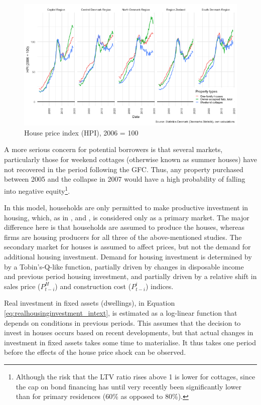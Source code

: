 \documentclass[
]{book}
\begin{document}
\begin{figure}[H]
\includegraphics[width=0.95\linewidth]{figures/fl-fi-house-prices-regional-1} \caption{House price index (HPI), 2006 = 100}\label{fig:fl-fi-house-prices-regional}
\end{figure}

A more serious concern for potential borrowers is that several markets, particularly those for weekend cottages (otherwise known as summer houses) have not recovered in the period following the GFC. Thus, any property purchased between 2005 and the collapse in 2007 would have a high probability of falling into negative equity\footnote{Although the risk that the LTV ratio rises above 1 is lower for cottages, since the cap on bond financing has until very recently been significantly lower than for primary residences (60\% as opposed to 80\%).}.

In this model, households are only permitted to make productive investment in
housing, which, as in \citet{Zezza2008}, \citet{fontana2013securitization} and \citet{beckta2015modelling}, is considered only as a primary market. The major difference here is that households are assumed to produce the houses, whereas firms are housing producers for all three of the above-mentioned studies. The secondary market for houses is assumed to affect prices, but not the demand for additional housing investment. Demand for housing investment is determined by by a Tobin's-Q-like function, partially driven by changes in disposable income and previous period housing investment, and partially driven by a relative shift in sales price (\({P^H_{t-i}}\)) and construction cost (\({P^i_{t-i}}\)) indices.

Real investment in fixed assets (dwellings), in Equation \ref{eq:realhousinginvestment_intext}, is estimated as a log-linear function that depends on conditions in previous periods. This assumes that the decision to invest in houses occurs based on recent developments, but that actual changes in investment in fixed assets takes some time to materialise. It thus takes one period before the effects of the house price shock can be observed.
\end{document}
